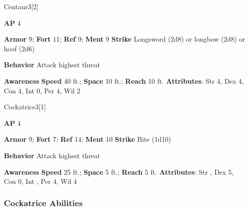 \begin{monsection}{Centaur}{3}[2]
\vspace{-1em}\vspace{-1em}
\begin{spellcontent}
\begin{spelltargetinginfo}
{\textbf{AP} 4}

\pari \textbf{Armor} 9;
\textbf{Fort} 11;
\textbf{Ref} 9;
\textbf{Ment} 9
\pari \textbf{Strike} Longsword  (2d8) or longbow  (2d8) or hoof  (2d6)



\pari \textbf{Behavior} Attack highest threat
\end{spelltargetinginfo}
\end{spellcontent}

\begin{monsterfooter}
\pari \textbf{Awareness} 
\pari \textbf{Speed} 40 ft.;
\textbf{Space} 10 ft.;
\textbf{Reach} 10 ft.
\pari \textbf{Attributes}:
Str 4,
Dex 4,
Con 4,
Int 0,
Per 4,
Wil 2
\end{monsterfooter}
\end{monsection}

\begin{monsection}{Cockatrice}{3}[1]
\vspace{-1em}\vspace{-1em}
\begin{spellcontent}
\begin{spelltargetinginfo}
{\textbf{AP} 4}

\pari \textbf{Armor} 9;
\textbf{Fort} 7;
\textbf{Ref} 14;
\textbf{Ment} 10
\pari \textbf{Strike} Bite  (1d10)



\pari \textbf{Behavior} Attack highest threat
\end{spelltargetinginfo}
\end{spellcontent}

\begin{monsterfooter}
\pari \textbf{Awareness} 
\pari \textbf{Speed} 25 ft.;
\textbf{Space} 5 ft.;
\textbf{Reach} 5 ft.
\pari \textbf{Attributes}:
Str ,
Dex 5,
Con 0,
Int ,
Per 4,
Wil 4
\end{monsterfooter}
\end{monsection}


\subsubsection{Cockatrice Abilities}

